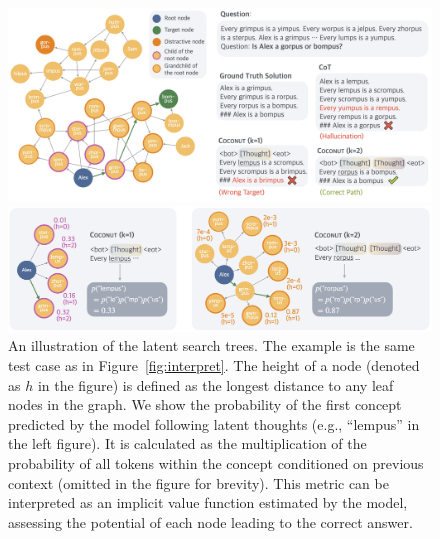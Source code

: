 \documentclass[]{fairmeta}
\newcommand{\ours}{\textsc{Coconut}\xspace}
\begin{document}
\begin{figure}[H]
    \centering
    \vspace{-15pt}
    \includegraphics[width=1\linewidth]{figures/figure_6_meta_3.png}
    
    \caption{A case study of ProsQA. The model trained with \textit{CoT} hallucinates an edge (\textit{Every yumpus is a rempus}) after getting stuck in a dead end. \ours (k=1) outputs a path that ends with an irrelevant node. \ours (k=2) solves the problem correctly.
    }
    \label{fig:interpret}
    \centering
    
    \vspace{15pt}
    \includegraphics[width=\linewidth]{figures/figure_7_meta_4.png}
    
    \caption{An illustration of the latent search trees. The example is the same test case as in Figure~\ref{fig:interpret}. The height of a node (denoted as $h$ in the figure) is defined as the longest distance to any leaf nodes in the graph. We show the probability of the first concept predicted by the model following latent thoughts (e.g., ``lempus'' in the left figure). It is calculated as the multiplication of the probability of all tokens within the concept conditioned on previous context (omitted in the figure for brevity). This metric can be interpreted as an implicit value function estimated by the model, assessing the potential of each node leading to the correct answer.}
    \label{fig:height}
    \vspace{-10pt}
\end{figure}
\end{document}
